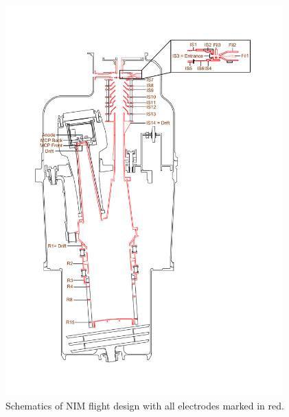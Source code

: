	
		\begin{figure}[h!]
			\centering
			\includegraphics[width= 0.95\textwidth]{Setup/NIM_schema.pdf}
			\caption{Schematics of NIM flight design with all electrodes marked in red.}
			\label{fig:MINPFMTot}
		\end{figure}
	
	
	
